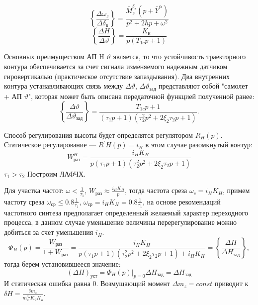\documentclass{article}
\begin{document}
\begin{figure}[H]
	\centering
	\label{fig:fig_51}
\end{figure}

\[
	\left\{\frac{\Delta \omega_z}{\Delta \delta_\text{в}} \right\} =
	\frac{\bar{M}_z^{\delta_\text{в}}(p + \bar{Y}^\alpha)}{p^2 + 2hp +
	\omega^2}
\]
\[
	\left\{ \frac{\Delta H}{\Delta \vartheta} \right\} =
	\frac{K_\text{н}}{p(T_{1c}p +1)}
\]

Основных преимуществом АП H $\vartheta$ является, то что устойчивость
траекторного контура обеспечивается за счет сигнала изменяемого надежным
датчиком гировертикалью (практическое отсутствие запаздывания). Два внутренних
контура устанавливающих связь между $\Delta \vartheta$, $\Delta
	\vartheta_\text{зад}$ представляют собой "самолет + АП $\vartheta$", которая
может быть описана передаточной функцией полученной ранее:
\[
	\left\{\frac{\Delta \vartheta}{\Delta \vartheta_\text{зад}} \right\}
	=\frac{T_{1c}p + 1}{(\tau_1 p + 1) (\tau_2^2p^2 + 2 \xi_2 \tau_2 p + 1)}.
\]
\begin{figure}[H]
	\centering
	\label{fig:fig_52}
\end{figure}
Способ регулирования высоты будет определятся регулятором $R_H(p)$.
Статическое регулирование --- $R^{'}H(p) = i_H$ в этом случае разомкнутый
контур:
\[
	W_\text{раз}^H =\frac{i_H K_H}{p(\tau_1 p + 1)(\tau_2^2 p^2 + 2 \xi_2
		\tau_2 p + 1)}
\]
$\tau_1 > \tau_2$
Построим ЛАФЧХ.

\begin{figure}[H]
	\centering
	\label{fig:fig_53}
\end{figure}


Для участка частот:
$\omega < \frac{1}{\tau_1}$, $W_\text{раз} \approx \frac{i_H K_H }{p} $, тогда
частота среза $\omega_c = i_H  K_H$, примем частоту среза $\omega_\text{ср} \le
	0.8 \frac{1}{\tau_1}$, $\omega_\text{ср} = i_H K_H =0.8 \frac{1}{\tau_1} $, на
основе рекомендаций частотного синтеза предполагает определенный желаемый
характер переходного процесса, в данном случае уменьшение величины
перерегулирование можно добиться за счет уменьшения $i_H$.
\[
	\Phi_H (p) =\frac{W_\text{раз}}{1 + W_\text{раз}} =\frac{i_H K_H}{p(\tau_1
		p +1)(\tau_2^2 p^2 + 2 \xi_2 \tau_2 p + 1) + i_H K_H} = \left\{
	\frac{\Delta H}{\Delta H_\text{зад}} \right\},
\]
тогда берем установившееся значение:
\[
	(\Delta H)_\text{уст} = \Phi_H(p)|_{p=0} \Delta H_\text{зад} = \Delta
	H_\text{зад}
\]
И статическая ошибка равна 0. Возмущающий момент $\Delta m_z = const$ приводит
к $\delta H =\frac{\delta m_z}{m_z^{\delta_\text{н}} K_\vartheta K_\text{н}}$.
\end{document}
